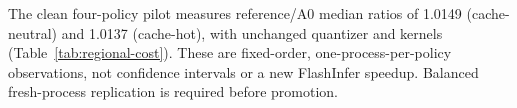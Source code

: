 The clean four-policy pilot measures reference/A0 median ratios of 1.0149 (cache-neutral) and 1.0137 (cache-hot), with unchanged quantizer and kernels (Table~\ref{tab:regional-cost}). These are fixed-order, one-process-per-policy observations, not confidence intervals or a new FlashInfer speedup. Balanced fresh-process replication is required before promotion.
